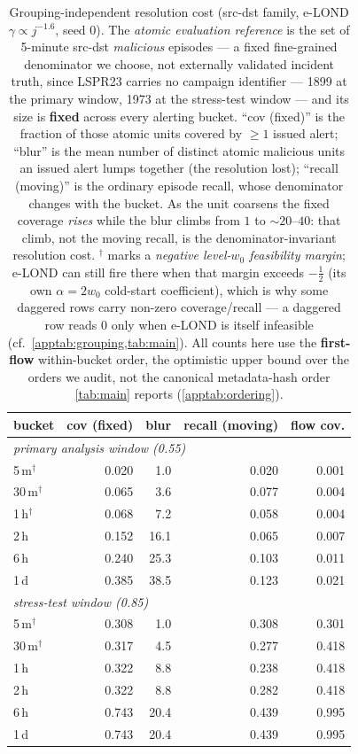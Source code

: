 \begin{table}[t]
\centering
\caption{Grouping-independent resolution cost (src-dst family, e-LOND $\gamma\propto j^{-1.6}$,
seed 0). The \emph{atomic evaluation reference} is the set of 5-minute src-dst \emph{malicious}
episodes --- a fixed fine-grained denominator we choose, not externally validated incident truth, since
LSPR23 carries no campaign identifier ---
1899 at the primary window, 1973 at the
stress-test window --- and its size is \textbf{fixed} across every alerting bucket. ``cov (fixed)''
is the fraction of those atomic units covered by $\ge\!1$ issued alert; ``blur'' is the mean number
of distinct atomic malicious units an issued alert lumps together (the resolution lost); ``recall
(moving)'' is the ordinary episode recall, whose denominator changes with the bucket. As the unit
coarsens the fixed coverage \emph{rises} while the blur climbs from $1$ to $\sim\!20$--$40$: that
climb, not the moving recall, is the denominator-invariant resolution cost. $^{\dagger}$ marks a
\emph{negative level-$w_0$ feasibility margin}; e-LOND can still fire there when that margin exceeds
$-\tfrac12$ (its own $\alpha=2w_0$ cold-start coefficient), which is why some daggered rows carry
non-zero coverage/recall --- a daggered row reads $0$ only when e-LOND is itself infeasible
(cf.\ \cref{apptab:grouping,tab:main}). All counts here use the \textbf{first-flow} within-bucket order, the optimistic upper bound over the orders we audit, not the canonical metadata-hash order \cref{tab:main} reports (\cref{apptab:ordering}).}
\label{apptab:w7coverage}
\begin{tabular}{lrrrr}
\toprule
bucket & cov (fixed) & blur & recall (moving) & flow cov. \\
\midrule
\multicolumn{5}{l}{\emph{primary analysis window (0.55)}} \\
5\,m$^{\dagger}$ & 0.020 & 1.0 & 0.020 & 0.001 \\
30\,m$^{\dagger}$ & 0.065 & 3.6 & 0.077 & 0.004 \\
1\,h$^{\dagger}$ & 0.068 & 7.2 & 0.058 & 0.004 \\
2\,h & 0.152 & 16.1 & 0.065 & 0.007 \\
6\,h & 0.240 & 25.3 & 0.103 & 0.011 \\
1\,d & 0.385 & 38.5 & 0.123 & 0.021 \\
\midrule
\multicolumn{5}{l}{\emph{stress-test window (0.85)}} \\
5\,m$^{\dagger}$ & 0.308 & 1.0 & 0.308 & 0.301 \\
30\,m$^{\dagger}$ & 0.317 & 4.5 & 0.277 & 0.418 \\
1\,h & 0.322 & 8.8 & 0.238 & 0.418 \\
2\,h & 0.322 & 8.8 & 0.282 & 0.418 \\
6\,h & 0.743 & 20.4 & 0.439 & 0.995 \\
1\,d & 0.743 & 20.4 & 0.439 & 0.995 \\
\bottomrule
\end{tabular}
\end{table}
